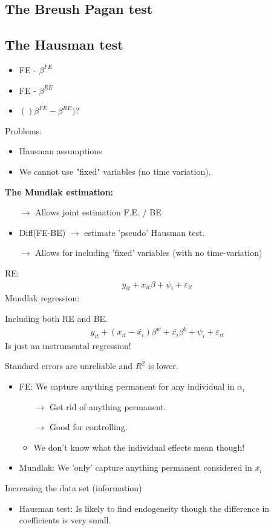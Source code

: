 \begin{multicols}{2}



\subsection{The Breush Pagan test}


\subsection{The Hausman test}
\begin{itemize}
  \item FE - $\beta^{FE}$
  \item FE - $\beta^{RE}$
  \item $()\beta^{FE}-\beta^{RE})$?
\end{itemize}
Problems:
\begin{itemize}
  \item Hausman assumptions
  \item We cannot use "fixed" variables (no time variation).
\end{itemize}
\textbf{The Mundlak estimation:}
\begin{itemize}
  \item[$\rightarrow$] Allows joint estimation F.E. / BE
  \item Diff(FE-BE) $\rightarrow$ estimate 'pseudo' Hausman test.
  \item[$\rightarrow$] Allows for including 'fixed' variables (with no time-variation)
\end{itemize}
RE:
\begin{align*}
  y_{it}+x_{it}\beta+\psi_i+\varepsilon_{it}
\end{align*}
Mundlak regression:\par
Including both RE and BE.
\begin{align*}
  y_{it}+(x_{it}-\bar{x_i})\beta^w+\bar{x_i}\beta^b +\psi_i+\varepsilon_{it}
\end{align*}
Is just an instrumental regression!\par
Standard errors are unreliable and $R^2$ is lower.
\begin{itemize}
  \item FE: We capture anything permanent for any individual in $\alpha_i$
  \begin{itemize}
    \item[$\rightarrow$] Get rid of anything permanent.
    \item[$\rightarrow$] Good for controlling.
    \item We don't know what the individual effects mean though!
  \end{itemize}
  \item Mundlak: We 'only' capture anything permanent considered in $\bar{x_i}$
\end{itemize}
Increasing the data set (information)
\begin{itemize}
  \item Hausman test: Is likely to find endogeneity though the difference in coefficients is very small.
\end{itemize}


\end{multicols}
